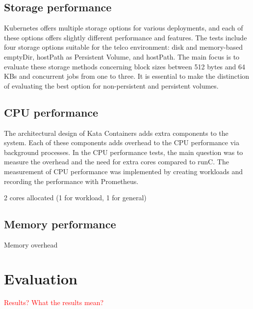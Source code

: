 \subsection{Storage performance}

Kubernetes offers multiple storage options for various deployments, and each of these options offers slightly different performance and features. The tests include four storage options suitable for the telco environment: disk and memory-based emptyDir, hostPath as Persistent Volume, and hostPath. The main focus is to evaluate these storage methods concerning block sizes between 512 bytes and 64 KBs and concurrent jobs from one to three. It is essential to make the distinction of evaluating the best option for non-persistent and persistent volumes.

\subsection{CPU performance}

The architectural design of Kata Containers adds extra components to the system. Each of these components adds overhead to the CPU performance via background processes. In the CPU performance tests, the main question was to measure the overhead and the need for extra cores compared to runC. The measurement of CPU performance was implemented by creating workloads and recording the performance with Prometheus. 

2 cores allocated (1 for workload, 1 for general)

\subsection{Memory performance}

Memory overhead

\section{Evaluation}

\textcolor{red}{Results?}
\textcolor{red}{What the results mean?}